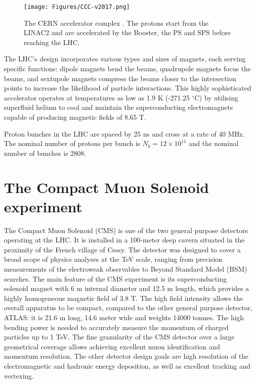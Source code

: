 \begin{figure}[htb]
\begin{center}
\texttt{[image: Figures/CCC-v2017.png]}
\end{center}
\caption{The CERN accelerator complex \cite{OPEN-PHO-ACCEL-2016-009}. The protons start from the LINAC2 and are accelerated by the Booster, the PS and SPS before reaching the LHC.}
\label{fig:CERNaccelerators}
\end{figure}

The LHC's design incorporates various types and sizes of magnets, each serving specific functions: dipole magnets bend the beams, quadrupole magnets focus the beams, and sextupole magnets compress the beams closer to the intersection points to increase the likelihood of particle interactions.
This highly sophisticated accelerator operates at temperatures as low as 1.9 K (-271.25 $^\circ$C) by utilising superfluid helium to cool and maintain the superconducting electromagnets capable of producing magnetic fields of 8.65 T.

Proton bunches in the LHC are spaced by 25 ns and cross at a rate of 40 MHz.
The nominal number of protons per bunch is $N_b = 12 \times 10^{11}$ and the nominal number of bunches is $2808$.

\section{The Compact Muon Solenoid experiment}
The Compact Muon Solenoid (CMS) is one of the two general purpose detectors operating at the LHC.
It is installed in a 100-meter deep cavern situated in the proximity of the French village of Cessy.
The detector was designed to cover a broad scope of physics analyses at the TeV scale, ranging from precision measurements of the electroweak observables to Beyond Standard Model (BSM) searches.
The main feature of the CMS experiment is its superconducting solenoid magnet with 6 m internal diameter and 12.5 m length, which provides a highly homogeneous magnetic field of 3.8 T.
The high field intensity allows the overall apparatus to be compact, compared to the other general purpose detector, ATLAS: it is 21.6 m long, 14.6 meter wide and weights 14000 tonnes.
The high bending power is needed to accurately measure the momentum of charged particles up to 1 TeV.
The fine granularity of the CMS detector over a large geometrical coverage allows achieving excellent muon identification and momentum resolution.
The other detector design goals are high resolution of the electromagnetic and hadronic energy deposition, as well as excellent tracking and vertexing.


